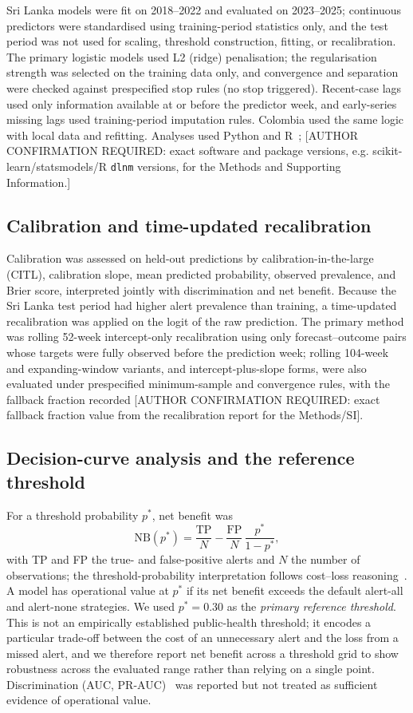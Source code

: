 \documentclass[11pt,a4paper]{article}
\begin{document}
Sri Lanka models were fit on 2018--2022 and evaluated on 2023--2025; continuous predictors were standardised using training-period statistics only, and the test period was not used for scaling, threshold construction, fitting, or recalibration. The primary logistic models used L2 (ridge) penalisation; the regularisation strength was selected on the training data only, and convergence and separation were checked against prespecified stop rules (no stop triggered). Recent-case lags used only information available at or before the predictor week, and early-series missing lags used training-period imputation rules. Colombia used the same logic with local data and refitting. Analyses used Python and R~\cite{RCoreTeam2024}; [AUTHOR CONFIRMATION REQUIRED: exact software and package versions, e.g. scikit-learn/statsmodels/R \texttt{dlnm} versions, for the Methods and Supporting Information.]

\subsection{Calibration and time-updated recalibration}
Calibration was assessed on held-out predictions by calibration-in-the-large (CITL), calibration slope, mean predicted probability, observed prevalence, and Brier score, interpreted jointly with discrimination and net benefit. Because the Sri Lanka test period had higher alert prevalence than training, a time-updated recalibration was applied on the logit of the raw prediction. The primary method was rolling 52-week intercept-only recalibration using only forecast--outcome pairs whose targets were fully observed before the prediction week; rolling 104-week and expanding-window variants, and intercept-plus-slope forms, were also evaluated under prespecified minimum-sample and convergence rules, with the fallback fraction recorded [AUTHOR CONFIRMATION REQUIRED: exact fallback fraction value from the recalibration report for the Methods/SI].

\subsection{Decision-curve analysis and the reference threshold}
For a threshold probability $p^*$, net benefit was
\[
\mathrm{NB}(p^*)=\frac{\mathrm{TP}}{N}-\frac{\mathrm{FP}}{N}\,\frac{p^*}{1-p^*},
\]
with TP and FP the true- and false-positive alerts and $N$ the number of observations; the threshold-probability interpretation follows cost--loss reasoning~\cite{Vickers2006,Murphy1985,Tozan2023}. A model has operational value at $p^*$ if its net benefit exceeds the default alert-all and alert-none strategies. We used $p^*=0.30$ as the \emph{primary reference threshold}. This is not an empirically established public-health threshold; it encodes a particular trade-off between the cost of an unnecessary alert and the loss from a missed alert, and we therefore report net benefit across a threshold grid to show robustness across the evaluated range rather than relying on a single point. Discrimination (AUC, PR-AUC)~\cite{SaitoRehmsmeier2015} was reported but not treated as sufficient evidence of operational value.
\end{document}
